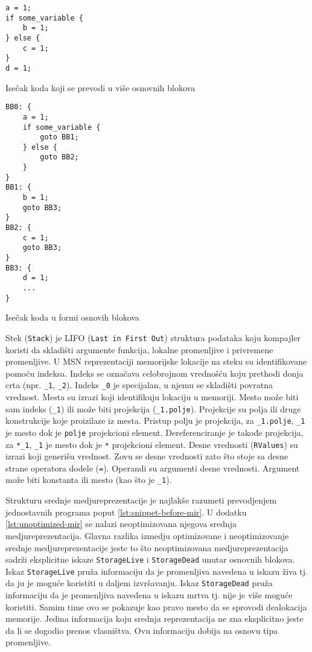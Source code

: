 \begin{listing}[H]
\begin{verbatim}
a = 1;
if some_variable {
    b = 1;
} else {
    c = 1;
}
d = 1;
\end{verbatim}
\caption{Isečak koda koji se prevodi u više osnovnih blokova}
\label{lst:block_code}
\end{listing}


\begin{listing}[H]
\begin{verbatim}
BB0: {
    a = 1;
    if some_variable {
        goto BB1;
    } else {
        goto BB2;
    }
}
BB1: {
    b = 1;
    goto BB3;
}
BB2: {
    c = 1;
    goto BB3;
}
BB3: {
    d = 1;
    ...
}
\end{verbatim}
\caption{Isečak koda u formi osnovih blokova}
\label{lst:block_block}
\end{listing}

Stek (\verb|Stack|) je LIFO (\verb|Last in First Out|) struktura podataka koju kompajler koristi da skladišti argumente funkcija,
lokalne promenljive i privremene promenljive. U MSN reprezentaciji memorijske lokacije na steku su identifikovane pomoću indeksa. 
Indeks se označava celobrojnom vrednošću koju prethodi donja crta (npr. \verb|_1|, \verb|_2|). Indeks \verb|_0| je specijalan, u njemu
se skladišti povratna vrednost. Mesta su izrazi koji identifikuju lokaciju u memoriji. Mesto može biti sam indeks (\verb|_1|) ili može biti
projekcija (\verb|_1.polje|). Projekcije su polja ili druge konstrukcije koje proizilaze iz mesta. Pristup polju je projekcija, za \verb|_1.polje|, \verb|_1| je mesto dok je \verb|polje| projekcioni element.
Dereferenciranje je takođe projekcija, za \verb|*_1|, \verb|_1| je mesto dok je \verb|*| projekcioni element. 
Desne vrednosti (\verb|RValues|) su izrazi koji generišu vrednost. Zovu se desne vrednosti zato što 
stoje sa desne strane operatora dodele (\verb|=|). Operandi su argumenti desne vrednosti. Argument može biti konstanta ili mesto (kao što je \verb|_1|).

Strukturu srednje medjureprezentacije je najlakše razumeti prevodjenjem jednostavnih programa poput \ref{lst:snippet-before-mir}. U dodatku \ref{lst:unoptimized-mir} se nalazi neoptimizovana njegova srednja medjureprezentacija. Glavna razlika izmedju optimizovane i neoptimizovanje srednje medjureprezentacije jeste to što neoptimizovana medjureprezentacija sadrži eksplicitne iskaze \verb|StorageLive| i \verb|StorageDead| unutar osnovnih blokova. Iskaz \verb|StorageLive| pruža informaciju da je promenljiva navedena u iskazu živa tj.
da ju je moguće koristiti u daljem izvršavanju. Iskaz \verb|StorageDead| pruža informaciju da je promenljiva navedena u iskazu mrtva
tj. nije je više moguće koristiti. Samim time ovo se pokazuje kao pravo mesto da se sprovodi dealokacija memorije.
Jedina informacija koju srednja reprezentacija ne zna eksplicitno jeste da li se dogodio prenos vlasništva. Ovu informaciju dobija na osnovu tipa promenljive.

